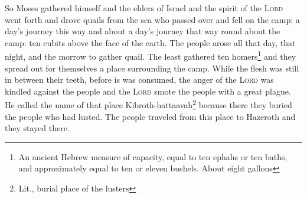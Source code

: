\begin{enumerate}
     So Moses gathered himself and the elders of Israel%
     and the spirit of the \textsc{Lord} went forth and drove quails from the sea who passed over and fell on the camp: a day's journey this way and about a day's journey that way round about the camp: ten cubits above the face of the earth.%
     The people arose all that day, that night, and the morrow to gather quail. The least gathered ten homers\footnote{An ancient Hebrew measure of capacity, equal to ten ephahs or ten baths, and approximately equal to ten or eleven bushels. About eight gallons} and they spread out for themselves a place surrounding the camp.%
     While the flesh was still in between their teeth, before is was consumed, the anger of the \textsc{Lord} was kindled against the people and the \textsc{Lord} smote the people with a great plague.%
     He called the name of that place Kibroth-hattaavah\footnote{Lit., burial place of the lusters} because there they buried the people who had lusted.%
     The people traveled from this place to Hazeroth and they stayed there.%
\end{enumerate}
